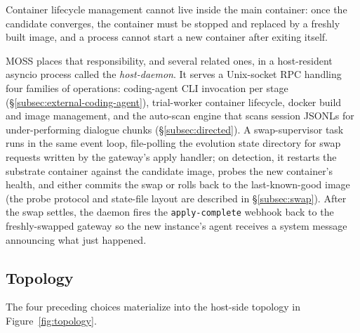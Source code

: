 \documentclass{article}
\begin{document}
Container lifecycle management cannot live inside the main container: once the candidate converges, the container must be stopped and replaced by a freshly built image, and a process cannot start a new container after exiting itself.

MOSS places that responsibility, and several related ones, in a host-resident asyncio process called the \emph{host-daemon}. It serves a Unix-socket RPC handling four families of operations: coding-agent CLI invocation per stage (\S\ref{subsec:external-coding-agent}), trial-worker container lifecycle, docker build and image management, and the auto-scan engine that scans session JSONLs for under-performing dialogue chunks (\S\ref{subsec:directed}). A swap-supervisor task runs in the same event loop, file-polling the evolution state directory for swap requests written by the gateway's apply handler; on detection, it restarts the substrate container against the candidate image, probes the new container's health, and either commits the swap or rolls back to the last-known-good image (the probe protocol and state-file layout are described in \S\ref{subsec:swap}). After the swap settles, the daemon fires the \texttt{apply-complete} webhook back to the freshly-swapped gateway so the new instance's agent receives a system message announcing what just happened.

\subsection{Topology}
\label{subsec:topology}

The four preceding choices materialize into the host-side topology in Figure~\ref{fig:topology}.
\end{document}
